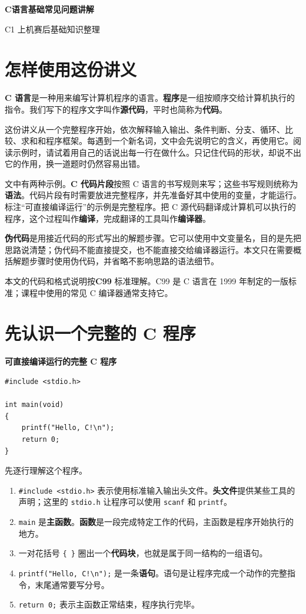 \documentclass[UTF8,zihao=-4,fontset=windows]{ctexart}
\newcommand{\term}[1]{\textbf{\color{navy}#1}}
\newcommand{\clabel}{\noindent\textbf{可直接编译运行的完整 C 程序}\par\nopagebreak}
\begin{document}
\begin{center}
  {\bfseries\color{navy} C语言基础常见问题讲解\par}
  \vspace{0.6em}
  {\color{darkgray} C1 上机赛后基础知识整理\par}
\end{center}
\vspace{1.2em}

\section*{怎样使用这份讲义}

\term{C 语言}是一种用来编写计算机程序的语言。\term{程序}是一组按顺序交给计算机执行的指令。我们写下的程序文字叫作\term{源代码}，平时也简称为\term{代码}。

这份讲义从一个完整程序开始，依次解释输入输出、条件判断、分支、循环、比较、求和和程序框架。每遇到一个新名词，文中会先说明它的含义，再使用它。阅读示例时，请试着用自己的话说出每一行在做什么。只记住代码的形状，却说不出它的作用，换一道题时仍然容易出错。

文中有两种示例。\term{C 代码片段}按照 C 语言的书写规则来写；这些书写规则统称为\term{语法}。代码片段有时需要放进完整程序，并先准备好其中使用的变量，才能运行。标注“可直接编译运行”的示例是完整程序。把 C 源代码翻译成计算机可以执行的程序，这个过程叫作\term{编译}，完成翻译的工具叫作\term{编译器}。

\term{伪代码}是用接近代码的形式写出的解题步骤。它可以使用中文变量名，目的是先把思路说清楚；伪代码不能直接提交，也不能直接交给编译器运行。本文只在需要概括解题步骤时使用伪代码，并省略不影响思路的语法细节。

本文的代码和格式说明按\term{C99} 标准理解。C99 是 C 语言在 1999 年制定的一版标准；课程中使用的常见 C 编译器通常支持它。

\section{先认识一个完整的 C 程序}

\clabel
\begin{lstlisting}[style=cstyle]
#include <stdio.h>

int main(void)
{
    printf("Hello, C!\n");
    return 0;
}
\end{lstlisting}

先逐行理解这个程序。
\begin{enumerate}
  \item \verb|#include <stdio.h>| 表示使用标准输入输出头文件。\term{头文件}提供某些工具的声明；这里的 \verb|stdio.h| 让程序可以使用 \verb|scanf| 和 \verb|printf|。
  \item \verb|main| 是\term{主函数}。\term{函数}是一段完成特定工作的代码，主函数是程序开始执行的地方。
  \item 一对花括号 \verb|{ }| 圈出一个\term{代码块}，也就是属于同一结构的一组语句。
  \item \verb|printf("Hello, C!\n");| 是一条\term{语句}。语句是让程序完成一个动作的完整指令，末尾通常要写分号。
  \item \verb|return 0;| 表示主函数正常结束，程序执行完毕。
\end{enumerate}
\end{document}
